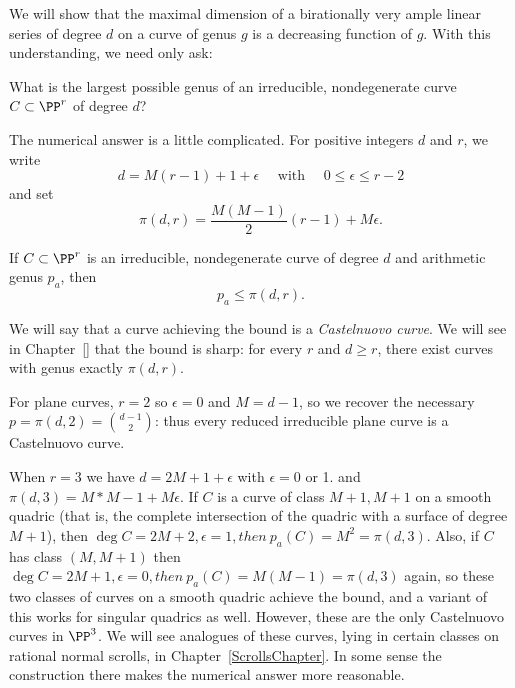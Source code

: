 We will show that the maximal dimension of a birationally very ample linear series of degree $d$ on a curve of genus $g$ is a decreasing function of $g$. With this understanding, we need only ask:

\begin{question}
What is the largest possible genus of an irreducible, nondegenerate curve $C \subset \PP^r$ of degree $d$?
\end{question}

The numerical answer is a little complicated. For positive integers $d$ and $r$, we write
$$
 d = M(r-1) + 1 + \epsilon \quad \text{ with } \quad 0 \leq \epsilon \leq r-2
$$
and set
$$
\pi(d,r) = \frac{M(M-1)}{2}(r-1) + M\epsilon.
$$

\begin{theorem}
If $C \subset \PP^r$ is an irreducible, nondegenerate curve of degree $d$ and arithmetic genus $p_a$, then
$$
p_a \leq \pi(d,r).
$$
\end{theorem}

We will say that a curve achieving the bound is a \emph{Castelnuovo curve}. 
We will see in Chapter~\ref{} that the bound is sharp: for every $r$ and $d \geq r$, there exist curves with genus exactly $\pi(d,r)$. 

\begin{example}
For plane curves, $r=2$ so $\epsilon = 0$ and $M = d-1$, so we recover the necessary $p = \pi(d,2) =  {d-1\choose 2}$: thus every reduced irreducible
plane curve is a Castelnuovo curve.
\end{example}

\begin{example}
 When $r=3$ we have $d= 2M+1+\epsilon$ with $\epsilon = 0$ or 1. and $\pi(d,3) = M*M-1+M\epsilon$. If $C$ is a curve of class
$M+1,M+1$ on a smooth quadric (that is, the complete intersection of the quadric with a surface of degree $M+1$), then
$\deg C = 2M+2, \epsilon=1, then \ p_a(C) = M^2 = \pi(d,3)$. Also, if $C$ has class $(M,M+1)$ then
$\deg C = 2M+1, \epsilon=0, then \ p_a(C) = M(M-1) = \pi(d,3)$ again, so these two classes of curves on a smooth quadric
achieve the bound, and a variant of this works for singular quadrics as well. However, these are the only Castelnuovo curves in $\PP^3$.
We will see analogues of these curves, lying in certain classes on rational normal scrolls, in Chapter~\ref{ScrollsChapter}. 
In some sense the construction there makes the  numerical answer more reasonable. 
\end{example}

